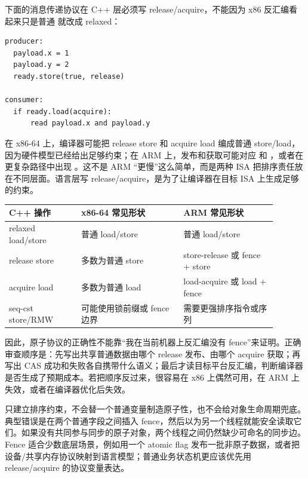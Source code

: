 下面的消息传递协议在 C++ 层必须写 release/acquire，不能因为 x86 反汇编看起来只是普通  就改成 relaxed：

\begin{lstlisting}[numbers=none,caption={发布数据的语言层合同}]
producer:
  payload.x = 1
  payload.y = 2
  ready.store(true, release)

consumer:
  if ready.load(acquire):
      read payload.x and payload.y
\end{lstlisting}

在 x86-64 上，编译器可能把 release store 和 acquire load 编成普通 store/load，因为硬件模型已经给出足够约束；在 ARM 上，发布和获取可能对应  和 ，或者在更复杂路径中出现 。这不是 ARM “更慢”这么简单，而是两种 ISA 把排序责任放在不同层面。语言层写 release/acquire，是为了让编译器在目标 ISA 上生成足够的约束。

\begin{center}
\small
\begin{tabular}{@{}p{0.24\linewidth}p{0.34\linewidth}p{0.31\linewidth}@{}}
\toprule
C++ 操作 & x86-64 常见形状 & ARM 常见形状 \\
\midrule
relaxed load/store & 普通 load/store & 普通 load/store \\
release store & 多数为普通 store & store-release 或 fence + store \\
acquire load & 多数为普通 load & load-acquire 或 load + fence \\
seq-cst store/RMW & 可能使用锁前缀或 fence 边界 & 需要更强排序指令或序列 \\
\bottomrule
\end{tabular}
\end{center}

因此，原子协议的正确性不能靠“我在当前机器上反汇编没有 fence”来证明。正确审查顺序是：先写出共享普通数据由哪个 release 发布、由哪个 acquire 获取；再写出 CAS 成功和失败各自携带什么语义；最后才读目标平台反汇编，判断编译器是否生成了预期成本。若把顺序反过来，很容易在 x86 上偶然可用，在 ARM 上失效，或者在编译器优化后失效。

 只建立排序约束，不会替一个普通变量制造原子性，也不会给对象生命周期兜底。典型错误是在两个普通字段之间插入 fence，然后以为另一个线程就能安全读取它们。如果没有共同参与同步的原子对象，两个线程之间仍然缺少可命名的同步边。Fence 适合少数底层场景，例如用一个 atomic flag 发布一批非原子数据，或者把设备/共享内存协议映射到语言模型；普通业务状态机更应该优先用 release/acquire 的协议变量表达。

